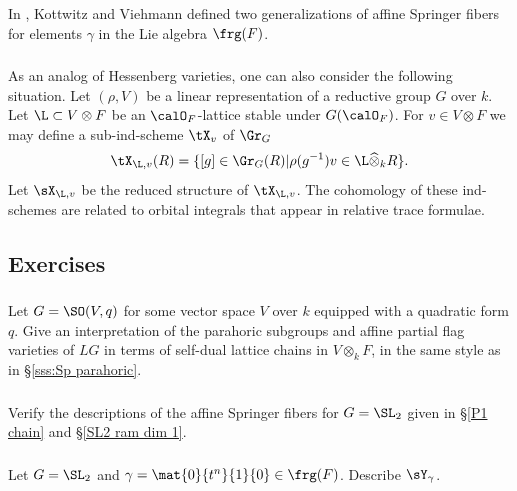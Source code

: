 \subsubsection{} In \cite{KV}, Kottwitz and Viehmann defined two generalizations of affine Springer fibers for elements  $\gamma$ in the Lie algebra $\frg(F)$.

\subsubsection{} As an analog of Hessenberg varieties, one can also consider the following situation. Let $(\rho,V)$ be a linear representation of a reductive group $G$ over $k$. Let $\L\subset V\otimes F$ be an $\calO_{F}$-lattice stable under $G(\calO_{F})$. For $v\in V\otimes F$ we may define a sub-ind-scheme $\tX_{v}$ of $\Gr_{G}$ 
\begin{equation*}
\tX_{\L, v}(R)=\{[g]\in\Gr_{G}(R)|\rho(g^{-1})v\in\L\widehat{\otimes}_{k}R\}.
\end{equation*}
Let $\sX_{\L,v}$ be the reduced structure of $\tX_{\L,v}$. The cohomology of these ind-schemes are related to orbital integrals that appear in relative trace formulae.



\subsection{Exercises}

\subsubsection{}\label{exII:SO parahoric} Let $G=\SO(V,q)$ for some vector space $V$ over $k$ equipped with a quadratic form $q$. Give an interpretation of the parahoric subgroups and affine partial flag varieties of $LG$ in terms of self-dual lattice chains in $V\otimes_{k}F$, in the same style as in \S\ref{sss:Sp parahoric}.

\subsubsection{}\label{exII:SL2} Verify the descriptions of the affine Springer fibers for $G=\SL_{2}$ given in \S\ref{P1 chain} and \S\ref{SL2 ram dim 1}.



\subsubsection{} Let $G=\SL_{2}$ and $\gamma=\mat{0}{t^{n}}{1}{0}\in\frg(F)$. Describe $\sY_{\gamma}$.

